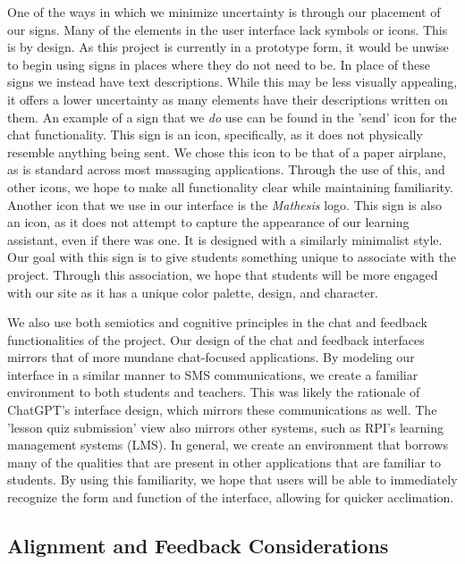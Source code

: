 \documentclass[12pt,a4paper]{article}
\begin{document}
    One of the ways in which we minimize uncertainty is through our placement of our signs.  Many
    of the elements in the user interface lack symbols or icons.  This is by design.  As this project
    is currently in a prototype form, it would be unwise to begin using signs in places where they do
    not need to be.  In place of these signs we instead have text descriptions.  While this may be
    less visually appealing, it offers a lower uncertainty as many elements have their descriptions
    written on them.  An example of a sign that we \textit{do} use can be found in the 'send' icon for the
    chat functionality.  This sign is an icon, specifically, as it does not physically resemble anything
    being sent.  We chose this icon to be that of a paper airplane, as is standard across most
    massaging applications.  Through the use of this, and other icons, we hope to make all functionality
    clear while maintaining familiarity.  Another icon that we use in our interface is the \textit{Mathesis}
    logo.  This sign is also an icon, as it does not attempt to capture the appearance of our learning
    assistant, even if there was one.  It is designed with a similarly minimalist style.  Our goal with
    this sign is to give students something unique to associate with the project.  Through this
    association, we hope that students will be more engaged with our site as it has a unique color
    palette, design, and character.

    We also use both semiotics and cognitive principles in the chat and feedback functionalities of
    the project.  Our design of the chat and feedback interfaces mirrors that of more mundane chat-focused
    applications.  By modeling our interface in a similar manner to SMS communications, we create a
    familiar environment to both students and teachers.  This was likely the rationale of ChatGPT's
    interface design, which mirrors these communications as well.  The 'lesson quiz submission' view also
    mirrors other systems, such as RPI's learning management systems (LMS).  In general, we create an
    environment that borrows many of the qualities that are present in other applications that are
    familiar to students. By using this familiarity, we hope that users will be able to immediately
    recognize the form and function of the interface, allowing for quicker acclimation.

    \subsection{Alignment and Feedback Considerations}
\end{document}
